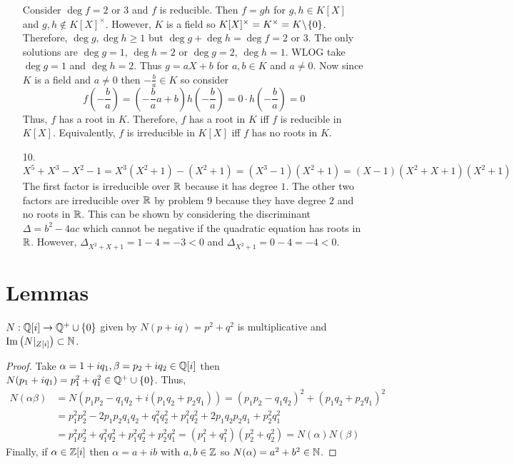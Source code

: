 \documentclass[12pt]{extarticle}
\begin{document}
\begin{enumerate}
Consider $\deg{f} = 2$ or $3$ and $f$ is reducible. Then $f = gh$ for $g, h \in K[X]$ and $g,h \notin K[X]^\times$. However, $K$ is a field so $K[X]^\times = K^\times = K \! \setminus \! \{0\}$. Therefore, $\deg{g}, \deg{h} \ge 1$ but $\deg{g} + \deg{h} = \deg{f} = 2$ or $3$. The only solutions are $\deg{g} = 1$, $\deg{h} = 2$ or $\deg{g} =  2$, $\deg{h} = 1$. WLOG take $\deg{g} = 1$ and $\deg{h} = 2$. Thus $g = aX + b$ for $a, b \in K$ and $a \neq 0$. Now since $K$ is a field and $a \neq 0$ then $-\frac{b}{a} \in K$ so consider \[f \left(-\frac{b}{a} \right) = \left( -\frac{b}{a} a + b \right) h \left(- \frac{b}{a} \right) = 0 \cdot h \left( -\frac{b}{a} \right) = 0\] Thus, $f$ has a root in $K$. Therefore, $f$ has a root in $K$ iff $f$ is reducible in $K[X]$. Equivalently, $f$ is irreducible in $K[X]$ iff $f$ has no roots in $K$. \smallskip

\item[10.] $X^5 + X^3 - X^2 - 1 = X^3(X^2 + 1) - (X^2 + 1) = (X^3 - 1)(X^2 + 1) = (X - 1)(X^2 + X + 1)(X^2 + 1)$ \\ The first factor is irreducible over $\mathbb{R}$ because it has degree $1$. The other two factors are irreducible over $\mathbb{R}$ by problem 9 because they have degree $2$ and no roots in $\mathbb{R}$. This can be shown by considering the discriminant $\Delta = b^2 - 4ac$ which cannot be negative if the quadratic equation has roots in $\mathbb{R}$. However, $\Delta_{X^2 + X + 1} = 1 - 4 = -3 < 0$ and $\Delta_{X^2 + 1} = 0 - 4 = - 4 < 0$.

\end{enumerate}

\section*{Lemmas}

\begin{lemma} \label{normprop} $N : \mathbb{Q}[i] \rightarrow \mathbb{Q}^+ \cup \{0\}$ given by $N(p + iq) = p^2 + q^2$ is multiplicative and $\mathrm{Im}\left( N|_{Z[i]} \right) \subset \mathbb{N}$.
\end{lemma}
\begin{proof}
Take $\alpha = 1 + i q_1, \beta = p_2 + i q_2 \in \mathbb{Q}[i]$ then $N(p_1 + i q_1) = p_1^2 + q_1^2 \in \mathbb{Q}^+ \cup \{0\}$. Thus, 
\begin{align*}
N(\alpha \beta) &= N(p_1 p_2 - q_1 q_2 + i(p_1 q_2 + p_2 q_1)) = (p_1 p_2 - q_1 q_2)^2 + (p_1 q_2 + p_2 q_1)^2 \\ &= p_1^2 p_2^2 - 2 p_1 p_2 q_1 q_2 + q_1^2 q_2^2 + p_1^2 q_2^2 + 2 p_1 q_2 p_2 q_1 + p_2^2 q_1^2 \\ &= p_1^2 p_2^2 + q_1^2 q_2^2 + p_1^2 q_2^2 + p_2^2 q_1^2 = (p_1^2 + q_1^2)(p_2^2 + q_2^2) = N(\alpha) N(\beta)
\end{align*}
Finally, if $\alpha \in \mathbb{Z}[i]$ then $\alpha = a + ib$ with $a, b \in \mathbb{Z}$ so $N(\alpha) = a^2 + b^2 \in \mathbb{N}$.
\end{proof}
\end{document}

